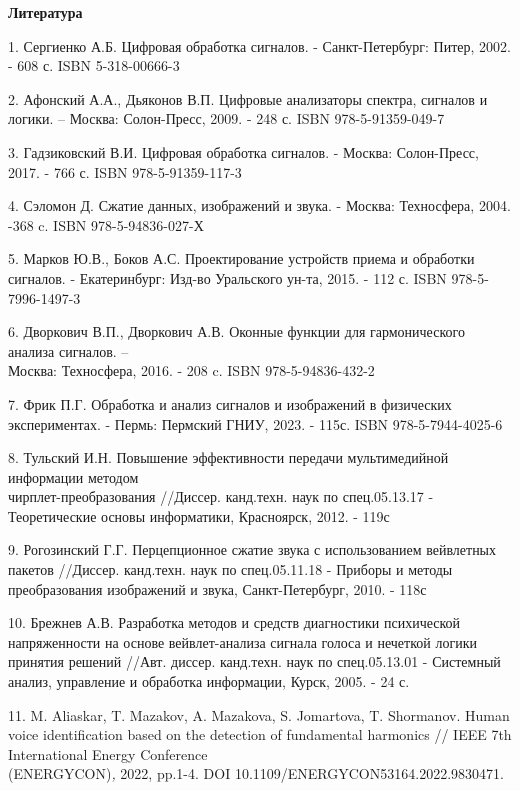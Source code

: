 \begin{center}
{\bfseries Литература}
\end{center}

\begin{references}
1. Сергиенко А.Б. Цифровая обработка сигналов. - Санкт-Петербург: Питер,
2002. - 608 с. ISBN 5-318-00666-3

2. Афонский А.А., Дьяконов В.П. Цифровые анализаторы спектра, сигналов и
логики. -- Москва: Солон-Пресс, 2009. - 248 с. ISBN 978-5-91359-049-7

3. Гадзиковский В.И. Цифровая обработка сигналов. - Москва: Солон-Пресс,
2017. - 766 с. ISBN 978-5-91359-117-3

4. Сэломон Д. Сжатие данных, изображений и звука. - Москва: Техносфера,
2004. -368 c. ISBN 978-5-94836-027-Х

5. Марков Ю.В., Боков А.С. Проектирование устройств приема и обработки
сигналов. - Екатеринбург: Изд-во Уральского ун-та, 2015. - 112 с. ISBN
978-5-7996-1497-3

6. Дворкович В.П., Дворкович А.В. Оконные функции для гармонического
анализа сигналов. -- \\Москва: Техносфера, 2016. - 208 c. ISBN
978-5-94836-432-2

7. Фрик П.Г. Обработка и анализ сигналов и изображений в физических
экспериментах. - Пермь: Пермский ГНИУ, 2023. - 115с. ISBN
978-5-7944-4025-6

8. Тульский И.Н. Повышение эффективности передачи мультимедийной
информации методом \\чирплет-преобразования //Диссер. канд.техн. наук по
спец.05.13.17 - Теоретические основы информатики, Красноярск, 2012. -
119с

9. Рогозинский Г.Г. Перцепционное сжатие звука с использованием
вейвлетных пакетов //Диссер. канд.техн. наук по спец.05.11.18 - Приборы
и методы преобразования изображений и звука, Санкт-Петербург, 2010. -
118с

10. Брежнев А.В. Разработка методов и средств диагностики психической
напряженности на основе вейвлет-анализа сигнала голоса и нечеткой логики
принятия решений //Авт. диссер. канд.техн. наук по спец.05.13.01 -
Системный анализ, управление и обработка информации, Курск, 2005. - 24
с.

11. M. Aliaskar, T. Mazakov, A. Mazakova, S. Jomartova, T. Shormanov.
Human voice identification based on the detection of fundamental
harmonics // IEEE 7th International Energy Conference\\
(ENERGYCON)\emph{,} 2022, pp.1-4. DOI
10.1109/ENERGYCON53164.2022.9830471.


\end{references}
